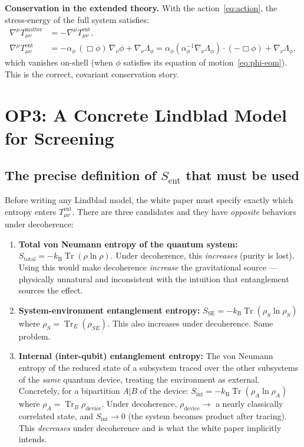 \documentclass[12pt,letterpaper]{article}
\theoremstyle{plain}
\theoremstyle{definition}
\theoremstyle{remark}
\newcommand{\kB}{k_{\mathrm{B}}}
\newcommand{\tr}{\operatorname{Tr}}
\begin{document}
\textbf{Conservation in the extended theory.}  With the action~\eqref{eq:action}, the
stress-energy of the full system satisfies:
\begin{align}
  \nabla^\mu T^{\mathrm{matter}}_{\mu\nu}
  &= -\nabla^\mu T^{\mathrm{ent}}_{\mu\nu}, \label{eq:cons1} \\
  \nabla^\mu T^{\mathrm{ent}}_{\mu\nu}
  &= -\alpha_\phi\,(\Box\phi)\,\nabla_\nu\phi
    + \nabla_\nu\Lambda_\phi
    = \alpha_\phi(\alpha_\phi^{-1}\nabla_\nu\Lambda_\phi)\cdot(-\Box\phi)
    + \nabla_\nu\Lambda_\phi, \label{eq:cons2}
\end{align}
which vanishes on-shell (when $\phi$ satisfies its equation of motion~\eqref{eq:phi-eom}).
This is the correct, covariant conservation story.

\section{OP3: A Concrete Lindblad Model for Screening}
\label{sec:op3}

\subsection{The precise definition of $S_{\mathrm{ent}}$ that must be used}

Before writing any Lindblad model, the white paper must specify exactly which entropy
enters $T^{\mathrm{ent}}_{\mu\nu}$.  There are three candidates and they have
\emph{opposite} behaviors under decoherence:

\begin{enumerate}
  \item \textbf{Total von Neumann entropy of the quantum system:}
    $S_{\mathrm{total}} = -\kB\tr(\rho\ln\rho)$.
    Under decoherence, this \emph{increases} (purity is lost).
    Using this would make decoherence \emph{increase} the gravitational source --- physically
    unnatural and inconsistent with the intuition that entanglement sources the effect.

  \item \textbf{System-environment entanglement entropy:}
    $S_{\mathrm{SE}} = -\kB\tr(\rho_S\ln\rho_S)$ where $\rho_S = \tr_E(\rho_{SE})$.
    This also increases under decoherence.  Same problem.

  \item \textbf{Internal (inter-qubit) entanglement entropy:}
    The von Neumann entropy of the reduced state of a subsystem traced over the other
    subsystems of the \emph{same} quantum device, treating the environment as external.
    Concretely, for a bipartition $A|B$ of the device:
    $S_{\mathrm{int}} = -\kB\tr(\rho_A\ln\rho_A)$ where $\rho_A = \tr_B\rho_{\mathrm{device}}$.
    Under decoherence, $\rho_{\mathrm{device}} \to$ a nearly classically correlated state,
    and $S_{\mathrm{int}} \to 0$ (the system becomes product after tracing).
    This \emph{decreases} under decoherence and is what the white paper implicitly intends.
\end{enumerate}
\end{document}
